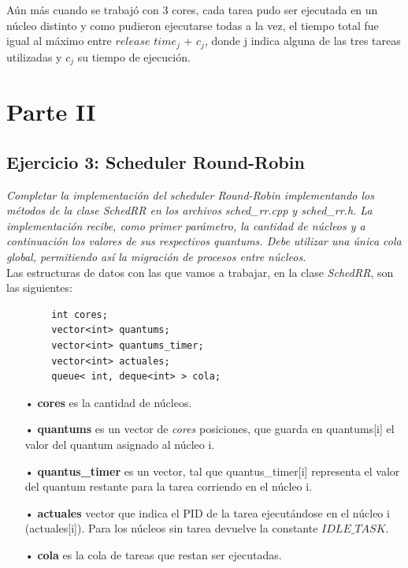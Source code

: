 \documentclass[a4paper]{article}
\begin{document}
Aún más cuando se trabajó con 3 cores, cada tarea pudo ser ejecutada en un núcleo distinto y como pudieron ejecutarse todas a la vez, el tiempo total fue igual al máximo entre $release$ $time_j$ + $c_j$, donde j indica alguna de las tres tareas utilizadas y $c_j$ su tiempo de ejecución.   



\newpage

\section{Parte II}


\subsection{Ejercicio 3: Scheduler Round-Robin}\label{RoundR}

\textit{Completar la implementaci\'on del scheduler Round-Robin implementando los m\'etodos de la clase SchedRR en los archivos sched_rr.cpp y sched_rr.h. La implementaci\'on recibe, como primer par\'ametro, la cantidad de n\'ucleos y a continuaci\'on los valores de sus respectivos quantums. Debe utilizar una \'unica cola global, permitiendo as\'i la migraci\'on de procesos entre n\'ucleos.}\\


Las estructuras de datos con las que vamos a trabajar, en la clase \emph{SchedRR}, son las siguientes:
	\begin{codesnippet}
	\begin{verbatim}
		int cores;
		vector<int> quantums;
		vector<int> quantums_timer;
		vector<int> actuales;
		queue< int, deque<int> > cola;
	\end{verbatim}
	\end{codesnippet}
	
	\begin{itemize}
	\item[•]\textbf{cores} es la cantidad de n\'ucleos.
	\item[•]\textbf{quantums} es un vector de \textit{cores} posiciones, que guarda en quantums[i] el valor del quantum asignado al n\'ucleo i.
	\item[•]\textbf{quantus_timer} es un vector, tal que quantus_timer[i] representa el valor del quantum restante para la tarea corriendo en el n\'ucleo i.
	\item[•]\textbf{actuales} vector que indica el PID de la tarea ejecutándose en el núcleo i (actuales[i]). Para los núcleos sin tarea devuelve la constante $IDLE\_TASK$.
	\item[•]\textbf{cola} es la cola de tareas que restan ser ejecutadas.
	\end{itemize}	
\end{document}
